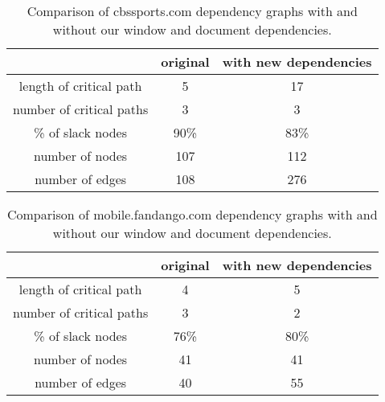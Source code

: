 \begin{table*}[tb]
\centering
\small
\begin{tabular}{|c|c|c|}
\hline
 & original & with new dependencies \\
\hline
length of critical path & 5 & 17 \\
number of critical paths & 3 & 3 \\
\% of slack nodes & 90\% & 83\% \\
number of nodes & 107 & 112 \\
number of edges & 108 & 276 \\
\hline
\end{tabular}\caption{Comparison of cbssports.com dependency graphs with and without our window and document dependencies.}
\label{t:cbssportsgraph}
\end{table*}

\begin{table*}[tb]
\centering
\small
\begin{tabular}{|c|c|c|}
\hline
 & original & with new dependencies \\
\hline
length of critical path & 4 & 5 \\
number of critical paths & 3 & 2 \\
\% of slack nodes & 76\% & 80\% \\
number of nodes & 41 & 41 \\
number of edges & 40 & 55 \\
\hline
\end{tabular}\caption{Comparison of mobile.fandango.com dependency graphs with and without our window and document dependencies.}
\label{t:fandangograph}
\end{table*}
